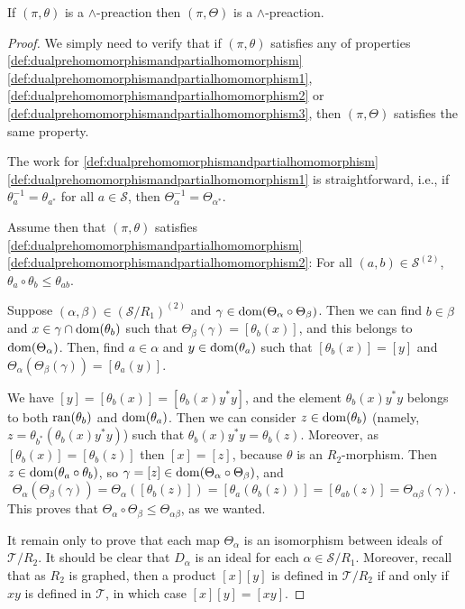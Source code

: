 \begin{proposition}
If $(\pi,\theta)$ is a $\land$-preaction then $(\pi,\Theta)$ is a $\land$-preaction.
\end{proposition}
\begin{proof}
    We simply need to verify that if $(\pi,\theta)$ satisfies any of properties \ref{def:dualprehomomorphismandpartialhomomorphism}\ref{def:dualprehomomorphismandpartialhomomorphism1}, \ref{def:dualprehomomorphismandpartialhomomorphism2} or \ref{def:dualprehomomorphismandpartialhomomorphism3}, then $(\pi,\Theta)$ satisfies the same property.
    
    The work for \ref{def:dualprehomomorphismandpartialhomomorphism}\ref{def:dualprehomomorphismandpartialhomomorphism1} is straightforward, i.e., if $\theta_a^{-1}=\theta_{a^*}$ for all $a\in\mathcal{S}$, then $\Theta_\alpha^{-1}=\Theta_{\alpha^*}$.
    
    Assume then that $(\pi,\theta)$ satisfies \ref{def:dualprehomomorphismandpartialhomomorphism}\ref{def:dualprehomomorphismandpartialhomomorphism2}: For all $(a,b)\in\mathcal{S}^{(2)}$, $\theta_a\circ\theta_b\leq\theta_{ab}$.
    
    Suppose $(\alpha,\beta)\in(\mathcal{S}/R_1)^{(2)}$ and $\gamma\in\operatorname{dom}(\Theta_\alpha\circ\Theta_\beta)$. Then we can find $b\in\beta$ and $x\in\gamma\cap\operatorname{dom}(\theta_b)$ such that $\Theta_\beta(\gamma)=[\theta_b(x)]$, and this belongs to $\operatorname{dom}(\Theta_\alpha)$. Then, find $a\in\alpha$ and $y\in\operatorname{dom}(\theta_a)$ such that $[\theta_b(x)]=[y]$ and $\Theta_\alpha(\Theta_\beta(\gamma))=[\theta_a(y)]$.
    
    We have $[y]=[\theta_b(x)]=[\theta_b(x)y^*y]$, and the element $\theta_b(x)y^*y$ belongs to both $\operatorname{ran}(\theta_b)$ and $\operatorname{dom}(\theta_a)$. Then we can consider $z\in\operatorname{dom}(\theta_b)$ (namely, $z=\theta_{b^*}(\theta_b(x)y^*y)$) such that $\theta_b(x)y^*y=\theta_b(z)$. Moreover, as $[\theta_b(x)]=[\theta_b(z)]$ then $[x]=[z]$, because $\theta$ is an $R_2$-morphism. Then $z\in\operatorname{dom}(\theta_a\circ\theta_b)$, so $\gamma=[z]\in\operatorname{dom}(\Theta_\alpha\circ\Theta_\beta)$, and
    \[\Theta_\alpha(\Theta_\beta(\gamma))=\Theta_\alpha([\theta_b(z)])=[\theta_a(\theta_b(z))]=[\theta_{ab}(z)]=\Theta_{\alpha\beta}(\gamma).\]
    This proves that $\Theta_\alpha\circ\Theta_\beta\leq\Theta_{\alpha\beta}$, as we wanted.
    
    It remain only to prove that each map $\Theta_\alpha$ is an isomorphism between ideals of $\mathcal{T}/R_2$. It should be clear that $D_\alpha$ is an ideal for each $\alpha\in\mathcal{S}/R_1$. Moreover, recall that as $R_2$ is graphed, then a product $[x][y]$ is defined in $\mathcal{T}/R_2$ if and only if $xy$ is defined in $\mathcal{T}$, in which case $[x][y]=[xy]$.
    

\end{proof}
